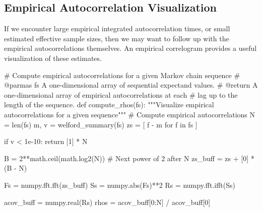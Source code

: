 \documentclass[
  letterpaper,
  DIV=11,
  numbers=noendperiod]{scrartcl}
\newenvironment{Shaded}{\begin{snugshade}}{\end{snugshade}}
\newcommand{\BuiltInTok}[1]{\textcolor[rgb]{0.00,0.23,0.31}{#1}}
\newcommand{\CommentTok}[1]{\textcolor[rgb]{0.37,0.37,0.37}{#1}}
\newcommand{\ControlFlowTok}[1]{\textcolor[rgb]{0.00,0.23,0.31}{#1}}
\newcommand{\DecValTok}[1]{\textcolor[rgb]{0.68,0.00,0.00}{#1}}
\newcommand{\FloatTok}[1]{\textcolor[rgb]{0.68,0.00,0.00}{#1}}
\newcommand{\KeywordTok}[1]{\textcolor[rgb]{0.00,0.23,0.31}{#1}}
\newcommand{\NormalTok}[1]{\textcolor[rgb]{0.00,0.23,0.31}{#1}}
\newcommand{\OperatorTok}[1]{\textcolor[rgb]{0.37,0.37,0.37}{#1}}
\begin{document}
\subsection{Empirical Autocorrelation
Visualization}\label{empirical-autocorrelation-visualization}

If we encounter large empirical integrated autocorrelation times, or
small estimated effective sample sizes, then we may want to follow up
with the empirical autocorrelations themselves. An empirical correlogram
provides a useful visualization of these estimates.

\begin{Shaded}
\begin{Highlighting}[]
\CommentTok{\# Compute empirical autocorrelations for a given Markov chain sequence}
\CommentTok{\# @parmas fs A one{-}dimensional array of sequential expectand values.}
\CommentTok{\# @return A one{-}dimensional array of empirical autocorrelations at each}
\CommentTok{\#         lag up to the length of the sequence.}
\KeywordTok{def}\NormalTok{ compute\_rhos(fs):}
  \CommentTok{"""Visualize empirical autocorrelations for a given sequence"""}
  \CommentTok{\# Compute empirical autocorrelations}
\NormalTok{  N }\OperatorTok{=} \BuiltInTok{len}\NormalTok{(fs)}
\NormalTok{  m, v }\OperatorTok{=}\NormalTok{ welford\_summary(fs)}
\NormalTok{  zs }\OperatorTok{=}\NormalTok{ [ f }\OperatorTok{{-}}\NormalTok{ m }\ControlFlowTok{for}\NormalTok{ f }\KeywordTok{in}\NormalTok{ fs ]}
  
  \ControlFlowTok{if}\NormalTok{ v }\OperatorTok{\textless{}} \FloatTok{1e{-}10}\NormalTok{:}
    \ControlFlowTok{return}\NormalTok{ [}\DecValTok{1}\NormalTok{] }\OperatorTok{*}\NormalTok{ N}
  
\NormalTok{  B }\OperatorTok{=} \DecValTok{2}\OperatorTok{**}\NormalTok{math.ceil(math.log2(N)) }\CommentTok{\# Next power of 2 after N}
\NormalTok{  zs\_buff }\OperatorTok{=}\NormalTok{ zs }\OperatorTok{+}\NormalTok{ [}\DecValTok{0}\NormalTok{] }\OperatorTok{*}\NormalTok{ (B }\OperatorTok{{-}}\NormalTok{ N)}
  
\NormalTok{  Fs }\OperatorTok{=}\NormalTok{ numpy.fft.fft(zs\_buff)}
\NormalTok{  Ss }\OperatorTok{=}\NormalTok{ numpy.}\BuiltInTok{abs}\NormalTok{(Fs)}\OperatorTok{**}\DecValTok{2}
\NormalTok{  Rs }\OperatorTok{=}\NormalTok{ numpy.fft.ifft(Ss)}
  
\NormalTok{  acov\_buff }\OperatorTok{=}\NormalTok{ numpy.real(Rs)}
\NormalTok{  rhos }\OperatorTok{=}\NormalTok{ acov\_buff[}\DecValTok{0}\NormalTok{:N] }\OperatorTok{/}\NormalTok{ acov\_buff[}\DecValTok{0}\NormalTok{]}
  

\end{Highlighting}
\end{Shaded}
\end{document}
